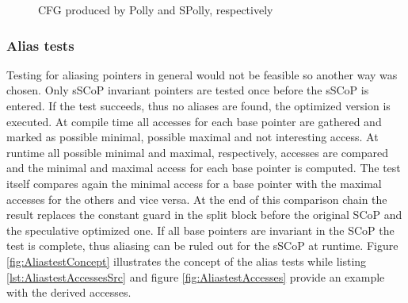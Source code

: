 \begin{figure}[htbp]
  \centering
  \caption{CFG produced by Polly and SPolly, respectively}
  \label{fig:SCoPCFG}  
\end{figure}


\begin{shaded}
\subsubsection{Alias tests} 

Testing for aliasing pointers in general would not be feasible so another way 
was chosen. Only sSCoP invariant pointers are tested once before the sSCoP is
entered. If the test succeeds, thus no aliases are found, the optimized version
is executed. At compile time all accesses for each base pointer are gathered and
marked as possible minimal, possible maximal and not interesting access. At 
runtime all possible minimal and maximal, respectively, accesses are compared 
and the minimal and maximal access for each base pointer is computed. The test 
itself compares again the minimal access for a base pointer with the maximal 
accesses for the others and vice versa. At the end of this comparison chain the 
result replaces the constant guard in the split block before the original SCoP 
and the speculative optimized one. If all base pointers are invariant in the
SCoP the test is complete, thus aliasing can be ruled out for the sSCoP at
runtime. Figure \ref{fig:AliastestConcept} illustrates the concept of the alias
tests while listing \ref{lst:AliastestAccessesSrc} and figure
\ref{fig:AliastestAccesses} provide an example with the derived accesses. 

\end{shaded}


